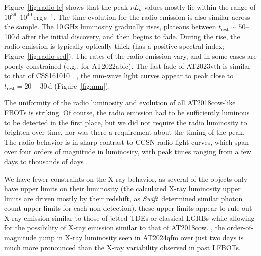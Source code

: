 \documentclass[twocolumn,twocolappendix, linenumbers, trackchanges]{aastex7}
\newcommand{\swift}{\emph{Swift}}
\begin{document}
 Figure~\ref{fig:radio-lc} shows that the peak $\nu L_{\nu}$ values mostly lie within the range of $10^{39}$--$10^{40}$\,erg\,s$^{-1}$. The time evolution for the radio emission is also similar across the sample.  The 10\,GHz luminosity gradually rises, plateaus between $t_{\mathrm{rest}}\sim50$--100\,d after the initial discovery, and then begins to fade. During the rise, the radio emission is typically optically thick (has a positive spectral index; Figure~\ref{fig:radio-sed}). The  rates of the radio emission vary, and in some cases are poorly constrained (e.g., for AT2022abfc). The fast fade of AT2023vth is similar to that of CSS161010 \citep{coppejans2020}. , the mm-wave light curves appear to peak close  to $t_{\text{rest}}=20-30\,$d (Figure~\ref{fig:mm}).  

The uniformity of the radio luminosity and evolution of all AT2018cow-like FBOTs is striking. Of course, the radio emission had to be sufficiently luminous to be detected in the first place, but we did not require the radio luminosity to brighten over time, nor was there a requirement about the timing of the peak. The radio behavior is in sharp contrast to CCSN 
radio light curves, which span over four orders of magnitude in luminosity, with peak times ranging from a few days to thousands of days \citep{Bietenholz2021}.  

We have fewer constraints on the X-ray behavior, as several of the objects only have upper limits on their luminosity (the calculated X-ray luminosity upper limits are driven mostly by their redshift, as \swift\ determined similar photon count upper limits for each non-detection).   these upper limits appear to rule out X-ray emission similar to those of jetted TDEs or classical LGRBs while allowing for the possibility of X-ray emission similar to that of AT2018cow.  , the order-of-magnitude jump in X-ray luminosity seen in AT2024qfm over just two days is much more pronounced than the X-ray variability observed in past LFBOTs. 
\end{document}
